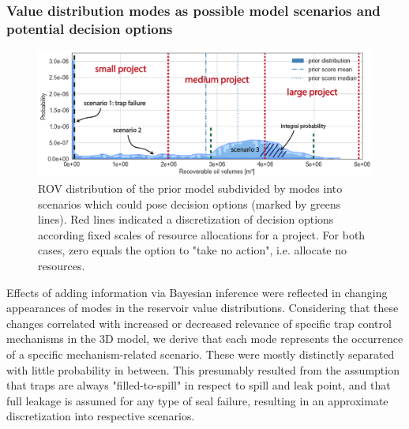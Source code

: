 	\subsubsection{Value distribution modes as possible model scenarios and potential decision options}	
	\begin{figure}[h]
		\centering
		\includegraphics[width=1\textwidth]{Figures/scenarios_options}
		\caption{ROV distribution of the prior model subdivided by modes into scenarios which could pose decision options (marked by greens lines). Red lines indicated a discretization of decision options according fixed scales of resource allocations for a project. For both cases, zero equals the option to "take no action", i.e. allocate no resources.}\label{fig:scenarios_options}
	\end{figure}
	Effects of adding information via Bayesian inference were reflected in changing appearances of modes in the reservoir value distributions. Considering that these changes correlated with increased or decreased relevance of specific trap control mechanisms in the 3D model, we derive that each mode represents the occurrence of a specific mechanism-related scenario. These were mostly distinctly separated with little probability in between. This presumably resulted from the assumption that traps are always "filled-to-spill" in respect to spill and leak point, and that full leakage is assumed for any type of seal failure, resulting in an approximate discretization into respective scenarios.\\

